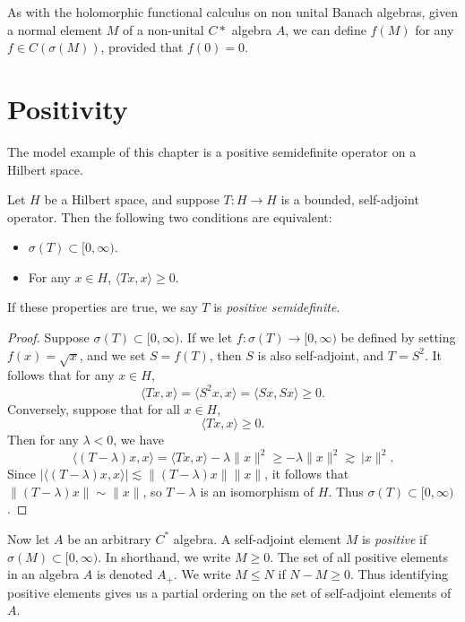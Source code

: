 As with the holomorphic functional calculus on non unital Banach algebras, given a normal element $M$ of a non-unital $C*$ algebra $A$, we can define $f(M)$ for any $f \in C(\sigma(M))$, provided that $f(0) = 0$.







\chapter{Positivity}

The model example of this chapter is a positive semidefinite operator on a Hilbert space.

\begin{theorem}
    Let $H$ be a Hilbert space, and suppose $T: H \to H$ is a bounded, self-adjoint operator. Then the following two conditions are equivalent:
    \begin{itemize}
        \item $\sigma(T) \subset [0,\infty)$.
        \item For any $x \in H$, $\langle Tx, x \rangle \geq 0$.
    \end{itemize}
    If these properties are true, we say $T$ is \emph{positive semidefinite}.
\end{theorem}
\begin{proof}
    Suppose $\sigma(T) \subset [0,\infty)$. If we let $f: \sigma(T) \to [0,\infty)$ be defined by setting $f(x) = \sqrt{x}$, and we set $S = f(T)$, then $S$ is also self-adjoint, and $T = S^2$. It follows that for any $x \in H$,
    \[ \langle Tx, x \rangle = \langle S^2x, x \rangle = \langle Sx, Sx \rangle \geq 0. \]
    Conversely, suppose that for all $x \in H$,
    \[ \langle Tx, x \rangle \geq 0. \]
    Then for any $\lambda < 0$, we have
    \[ \langle (T - \lambda)x, x \rangle = \langle Tx, x \rangle - \lambda \| x \|^2 \geq - \lambda \| x \|^2 \gtrsim \ |x \|^2. \]
    Since $| \langle (T - \lambda) x, x \rangle | \lesssim \| (T - \lambda) x \| \| x \|$, it follows that $\| (T - \lambda) x \| \sim \| x \|$, so $T - \lambda$ is an isomorphism of $H$. Thus $\sigma(T) \subset [0,\infty)$.
\end{proof}

Now let $A$ be an arbitrary $C^*$ algebra. A self-adjoint element $M$ is \emph{positive} if $\sigma(M) \subset [0, \infty)$. In shorthand, we write $M \geq 0$. The set of all positive elements in an algebra $A$ is denoted $A_+$. We write $M \leq N$ if $N - M \geq 0$. Thus identifying positive elements gives us a partial ordering on the set of self-adjoint elements of $A$.

